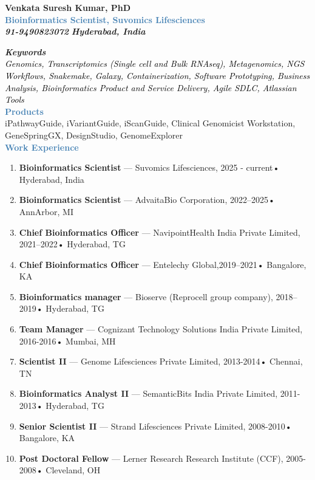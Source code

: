 \documentclass[12pt]{article}
\begin{document}
	\begin{center}
		{\Large\bf{Venkata Suresh Kumar, PhD}} 
		\href{https://github.com/svsuresh}{\textcolor{blue}{\faGithub}}
		\href{https://gist.github.com/svsuresh}{\textcolor{blue}{\faGitAlt}}
		\href{https://www.linkedin.com/in/svsk}{\textcolor{red}{\faLinkedin}}
		\href{mailto:kumars.sv@gmail.com}{\textcolor{darkgreen}{\faEnvelope}}\\
		{\textcolor{steelblue} {\textbf{Bioinformatics Scientist, Suvomics Lifesciences}}}\\
		\href{tel:91-9490823072}{\textcolor{darkgreen}{\faPhone}} \emph{\textbf{91-9490823072}}
		{\faHouse} \emph{\textbf{Hyderabad, India}}
	\end{center}
	
\noindent\small\textit{\textbf{Keywords}\\
	\textcolor{black}{Genomics, Transcriptomics (Single cell and Bulk RNAseq), Metagenomics, NGS Workflows, Snakemake, Galaxy, Containerization, Software Prototyping, Business Analysis, Bioinformatics Product and Service Delivery, Agile SDLC, Atlassian Tools}}\\

\noindent\textbf{\textcolor{steelblue}{Products}}\\
iPathwayGuide, iVariantGuide, iScanGuide, Clinical Genomicist Workstation, GeneSpringGX, DesignStudio, GenomeExplorer\\

\noindent\textbf{\textcolor{steelblue}{Work Experience}}\\[-20pt]
\begin{enumerate}
	\item \textbf{Bioinformatics Scientist} — Suvomics Lifesciences, 2025 - current• Hyderabad, India
	\item \textbf{Bioinformatics Scientist }— AdvaitaBio Corporation, 2022–2025• AnnArbor, MI
	\item \textbf{Chief Bioinformatics Officer} — NavipointHealth India Private Limited, 2021–2022• Hyderabad, TG
	\item \textbf{Chief Bioinformatics Officer} — Entelechy Global,2019–2021• Bangalore, KA
	\item \textbf{Bioinformatics manager }— Bioserve (Reprocell group company), 2018–2019• Hyderabad, TG
	\item \textbf{Team Manager }— Cognizant Technology Solutions India Private Limited, 2016-2016• Mumbai, MH
	\item \textbf{Scientist II} — Genome Lifesciences Private Limited, 2013-2014• Chennai, TN
	\item \textbf{Bioinformatics Analyst II} — SemanticBits India Private Limited, 2011-2013• Hyderabad, TG
	\item \textbf{Senior Scientist II} — Strand Lifesciences Private Limited, 2008-2010• Bangalore, KA
	\item \textbf{Post Doctoral Fellow} — Lerner Research Research Institute (CCF), 2005-2008• Cleveland, OH
\end{enumerate}
\end{document}
